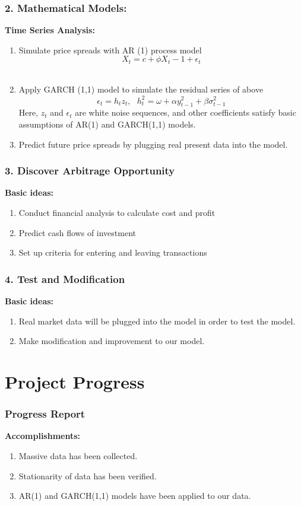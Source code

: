 \documentclass[compress,handout,10pt]{beamer}
\let\olditem\item
\renewcommand{\item}{\setlength{\itemsep}{0.5\baselineskip}\olditem}
\begin{document}
\begin{frame}
    \frametitle{2. Mathematical Models:}
{\bf{Time Series Analysis:}}\\
\vspace{7pt}
\begin{enumerate}
\item Simulate price spreads with AR (1) process model $$X_t=c+\phi X_t-1+\epsilon _t$$
\\
\item Apply GARCH (1,1) model to simulate the residual series of above$$\epsilon_t=h_tz_t, ~~~
h_t^2=\omega+\alpha y_{t-1}^2+\beta\sigma_{t-1}^2$$
Here, $z_t$ and $\epsilon_t$ are white noise sequences, and other coefficients satisfy basic assumptions of AR(1) and GARCH(1,1) models.
\item Predict future price spreads by plugging real present data into the model.
\end{enumerate}
\end{frame}
\begin{frame}
    \frametitle{3. Discover Arbitrage Opportunity}
{\bf{Basic ideas:}}\\
\begin{enumerate}
\item Conduct financial analysis to calculate cost and profit
\item Predict cash flows of investment
\item Set up criteria for entering and leaving transactions
\end{enumerate}
\end{frame}


\begin{frame}
    \frametitle{4. Test and Modification}
{\bf{Basic ideas:}}\\
\begin{enumerate}
\item Real market data will be plugged into the model in order to test the model.
\item Make modification and improvement to our model.
\end{enumerate}
\end{frame}

\section{Project Progress}
\begin{frame}
    \frametitle{Progress Report}
{\bf{Accomplishments:}}\\
\begin{enumerate}
\item Massive data has been collected.
\item Stationarity of data has been verified.
\item AR(1) and GARCH(1,1) models have been applied to our data.
\end{enumerate}
\end{frame}
\end{document}
